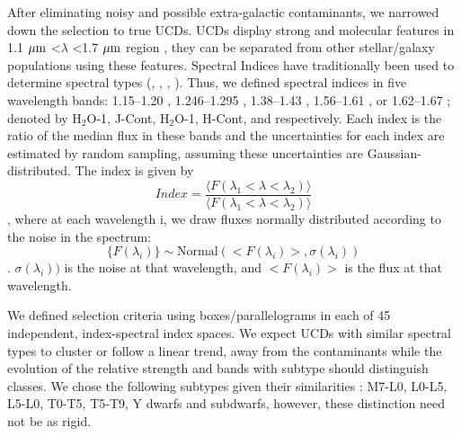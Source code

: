 \documentclass[manuscript]{aastex63}
\begin{document}
After eliminating noisy and possible extra-galactic contaminants, we narrowed down the selection to true UCDs. UCDs display strong \meth and \wat molecular features in 1.1 $\mbox{$\mu$m}$ \textless $\lambda$ \textless 1.7 $\mbox{$\mu$m}$  region \citep{2001PhDT.......116B}, they can be separated from other stellar/galaxy populations using these features. Spectral Indices have traditionally been used to determine spectral types (\citealt{1999AJ....117.1010T}, \citealt{2000AJ....119.3019C}, \citealt{2007ApJ...657..511A}, \citealt{2007ApJ...658..557B}). Thus, we defined  spectral indices in five wavelength bands: 1.15--1.20 \micron, 1.246--1.295 \micron, 1.38--1.43 \micron,  1.56--1.61 \micron, or 1.62--1.67 \micron; denoted by H$_2$O-1, J-Cont, H$_2$O-1, H-Cont, and \meth respectively. Each index is the ratio of the median flux in these bands and the uncertainties for each index are estimated by random sampling, assuming these uncertainties are Gaussian-distributed. The index is
 given by \begin{equation} Index=\frac{ \langle  F(\lambda_1<\lambda < \lambda_2) \rangle }{  \langle F(\lambda_1 < \lambda <\lambda_2) \rangle }\end{equation}, where at each wavelength i, we draw fluxes normally distributed according to the noise in the spectrum: \begin{equation} \{F(\lambda _i)\} \sim \text{Normal} (<F(\lambda_i)>, \sigma(\lambda_i )) \end{equation}. $\sigma(\lambda_i ))$ is the noise at that wavelength, and $<F(\lambda_i )>$ is the flux at that wavelength.

We defined selection criteria using boxes/parallelograms in each of 45 independent, index-spectral index spaces. We expect UCDs with similar spectral types to cluster or follow a linear trend, away from the contaminants while the evolution of the relative strength \wat and \meth bands with subtype should distinguish classes. We chose the following subtypes given their similarities : M7-L0, L0-L5, L5-L0, T0-T5, T5-T9, Y dwarfs and subdwarfs, however, these distinction need not be as rigid.
\end{document}
